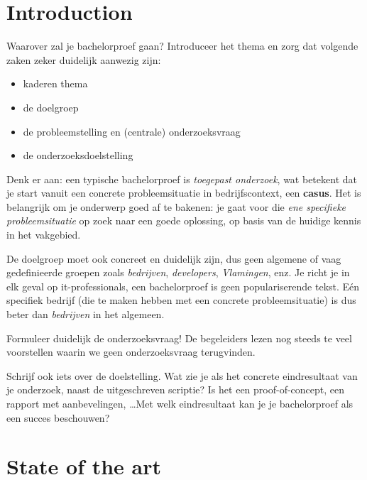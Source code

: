 
\section{Introduction}%
\label{sec:introduction}

Waarover zal je bachelorproef gaan? Introduceer het thema en zorg dat volgende zaken zeker duidelijk aanwezig zijn:

\begin{itemize}
  \item kaderen thema
  \item de doelgroep
  \item de probleemstelling en (centrale) onderzoeksvraag
  \item de onderzoeksdoelstelling
\end{itemize}

Denk er aan: een typische bachelorproef is \textit{toegepast onderzoek}, wat betekent dat je start vanuit een concrete probleemsituatie in bedrijfscontext, een \textbf{casus}. Het is belangrijk om je onderwerp goed af te bakenen: je gaat voor die \textit{ene specifieke probleemsituatie} op zoek naar een goede oplossing, op basis van de huidige kennis in het vakgebied.

De doelgroep moet ook concreet en duidelijk zijn, dus geen algemene of vaag gedefinieerde groepen zoals \emph{bedrijven}, \emph{developers}, \emph{Vlamingen}, enz. Je richt je in elk geval op it-professionals, een bachelorproef is geen populariserende tekst. Eén specifiek bedrijf (die te maken hebben met een concrete probleemsituatie) is dus beter dan \emph{bedrijven} in het algemeen.

Formuleer duidelijk de onderzoeksvraag! De begeleiders lezen nog steeds te veel voorstellen waarin we geen onderzoeksvraag terugvinden.

Schrijf ook iets over de doelstelling. Wat zie je als het concrete eindresultaat van je onderzoek, naast de uitgeschreven scriptie? Is het een proof-of-concept, een rapport met aanbevelingen, \ldots Met welk eindresultaat kan je je bachelorproef als een succes beschouwen?


\section{State of the art}%
\label{sec:state-of-the-art}

